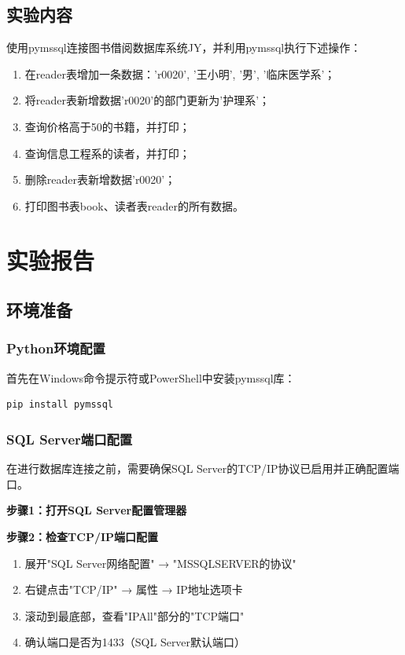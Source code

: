 \documentclass[a4paper]{article}
\begin{document}
\subsection{实验内容}
使用pymssql连接图书借阅数据库系统JY，并利用pymssql执行下述操作：
\begin{enumerate}
    \item 在reader表增加一条数据：'r0020', '王小明', '男', '临床医学系'；
    \item 将reader表新增数据'r0020'的部门更新为'护理系'；
    \item 查询价格高于50的书籍，并打印；
    \item 查询信息工程系的读者，并打印；
    \item 删除reader表新增数据'r0020'；
    \item 打印图书表book、读者表reader的所有数据。
\end{enumerate}

\section{实验报告}

\subsection{环境准备}

\subsubsection{Python环境配置}
首先在Windows命令提示符或PowerShell中安装pymssql库：
\begin{lstlisting}
pip install pymssql
\end{lstlisting}

\subsubsection{SQL Server端口配置}

在进行数据库连接之前，需要确保SQL Server的TCP/IP协议已启用并正确配置端口。

\textbf{步骤1：打开SQL Server配置管理器}

\textbf{步骤2：检查TCP/IP端口配置}
\begin{enumerate}
    \item 展开"SQL Server网络配置" → "MSSQLSERVER的协议"
    \item 右键点击"TCP/IP" → 属性 → IP地址选项卡
    \item 滚动到最底部，查看"IPAll"部分的"TCP端口"
    \item 确认端口是否为1433（SQL Server默认端口）
\end{enumerate}
\end{document}

